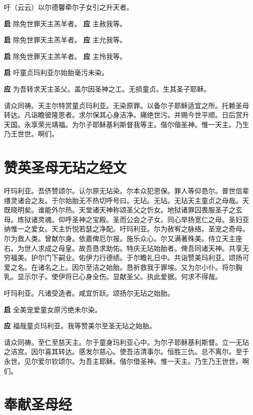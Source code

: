 \documentclass[UTF8,17pt]{ctexart}
\begin{document}
 吁（云云）以尔德馨牵尔⼦⼥引之升天者。

\textbf{启} \quad 除免世罪天主羔⽺者。 \hfill \textbf{应} \quad 主赦我等。

\textbf{启} \quad 除免世罪天主羔⽺者。 \hfill \textbf{应} \quad 主允我等。

\textbf{启} \quad 除免世罪天主羔⽺者。 \hfill \textbf{应} \quad 主怜我等。

\textbf{启} \quad 吁童贞玛利亚尔始胎毫污未染。

\textbf{应} \quad 为吾转求天主圣⽗。盖尔因圣神之⼯。⽆损童贞。⽣其圣⼦耶稣。

请众同祷。天主尔特赏童贞玛利亚。⽆染原罪。以备尔⼦耶稣适宜之所。托赖圣母转达。凡诣瞻彼隆恩者。求尔保其⼼⾝洁净。痛绝世污。并赐今世平顺。⽇后赏升天国。永享荣光靖福。为尔⼦耶稣基利斯督我等主。偕尔偕圣神。惟⼀天主。乃⽣乃王世世。啊们。

\section{赞英圣母⽆玷之经⽂}

吁玛利亚。吾侪赞颂尔。认尔原⽆玷染。尔本众犯恩保。罪⼈等仰恳尔。普世信辈缮灵诸会之友。于尔始胎⽆不热切呼号曰。⽆玷。⽆玷。⽆玷天主童贞之母哉。天既晓明矣。谁能外尔热。天堂诸天神称颂圣⽗之忻⼥。地狱诸罪囚畏服圣⼦之⽞母。炼狱诸灵魂。仰呼圣神之宝殿。圣⽽公会之⼦⼥。同⼼举扬宽仁之母。圣妇亚纳惟⼀之爱⼥。天主忻悦若瑟之净配。吁玛利亚。尔为赦宥之脉络。圣宠之奇母。尔为救⼈类。曾献尔⾝。依嘉俾厄尔报。施乐众⼼。尔又满著殊美。侍⽴天主座右。为世⼈求成之母皇。故吾恳求助佑。特庆⽆玷始胎者。俾吾同诸天神。共享⽆穷福美。护尔门下嗣业。佑伊⼒⾏德绩。于尔瞻礼⽇中。共诣赞美玛利亚。颂扬可爱之名。在诸名之上。因尔⾄洁之始胎。恳祈救我于罪埃。又为尔⼩仆。将尔胸乳。显⽰尔⼦。使伊将已⼼⾝全伤。显献圣⽗。执此爱据。何求不得哉。

吁玛利亚。凡诸受造者。咸宜忻跃。颂扬尔⽆玷之始胎。

\textbf{启} \quad 全美宠爱童⼥原污绝未尔染。

\textbf{应} \quad 福哉童贞玛利亚。我等赞美尔⾄圣⽆玷之始胎。

请众同祷。⾄仁⾄慈天主。尔于童⾝玛利亚⼼中。为尔⼦耶稣基利斯督。⽴⼀⽆玷之洁宫。因尔喜其转达。感发尔慈⼼。使吾洁清事尔。恒胜三仇。总不离尔。⾄于永世。见尔爱尔钦颂尔。为吾主耶稣。偕尔借圣神。惟⼀天主。乃⽣乃王世世。啊们。

\section{奉献圣母经}
\end{document}
